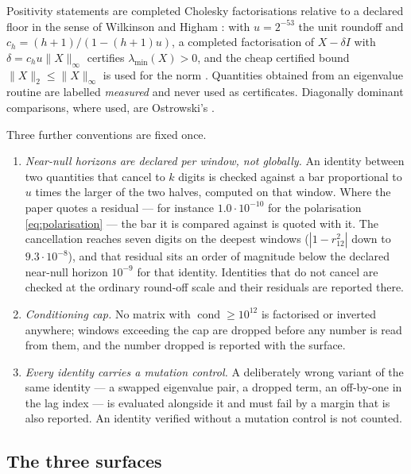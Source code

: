 \documentclass[11pt,a4paper]{article}
\theoremstyle{plain}
\theoremstyle{definition}
\newcommand{\lmin}{\lambda_{\min}}
\newcommand{\cond}{\operatorname{cond}}
\begin{document}
Positivity statements are completed Cholesky factorisations relative to a
declared floor in the sense of Wilkinson and Higham
\cite{Wilkinson1963,Higham2002}: with $u=2^{-53}$ the unit roundoff and
$c_h=(h+1)/(1-(h+1)u)$, a completed factorisation of $X-\delta I$ with
$\delta=c_hu\lVert X\rVert_\infty$ certifies $\lmin(X)>0$, and the cheap
certified bound $\lVert X\rVert_2\le\lVert X\rVert_\infty$ is used for the norm
\cite{Gershgorin1931}. Quantities obtained from an eigenvalue routine are
labelled \emph{measured} and never used as certificates. Diagonally dominant
comparisons, where used, are Ostrowski's \cite{Ostrowski1937}.

Three further conventions are fixed once.
\begin{enumerate}[label=\textup{(F\arabic*)},leftmargin=3.2em]
\item\label{F:null} \emph{Near-null horizons are declared per window, not
  globally.} An identity between two quantities that cancel to $k$ digits is
  checked against a bar proportional to $u$ times the larger of the two halves,
  computed on that window. Where the paper quotes a residual --- for instance
  $1.0\cdot10^{-10}$ for the polarisation \eqref{eq:polarisation} --- the bar
  it is compared against is quoted with it. The cancellation reaches seven
  digits on the deepest windows ($|1-r_{12}^{2}|$ down to $9.3\cdot10^{-8}$),
  and that residual sits an order of magnitude below the declared near-null
  horizon $10^{-9}$ for that identity. Identities that do not cancel are
  checked at the ordinary round-off scale and their residuals are reported
  there.
\item\label{F:cond} \emph{Conditioning cap.} No matrix with
  $\cond\ge10^{12}$ is factorised or inverted anywhere; windows exceeding the
  cap are dropped before any number is read from them, and the number dropped
  is reported with the surface.
\item\label{F:mutation} \emph{Every identity carries a mutation control.} A
  deliberately wrong variant of the same identity --- a swapped eigenvalue
  pair, a dropped term, an off-by-one in the lag index --- is evaluated
  alongside it and must fail by a margin that is also reported. An identity
  verified without a mutation control is not counted.
\end{enumerate}

\subsection{The three surfaces}
\label{sec:surfaces}
\end{document}
